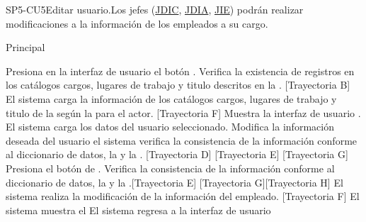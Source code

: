 \begin{UseCase}{SP5-CU5}{Editar usuario.}{Los jefes (\hyperlink{JDIC}{JDIC}, \hyperlink{JDIA}{JDIA}, \hyperlink{JIE}{JIE}) podrán realizar modificaciones a la información de los empleados a su cargo.}
{\begin{itemize}
		\end{itemize}
	}
	
\end{UseCase}

\begin{UCtrayectoria}{Principal}
	
	\UCpaso[\UCactor] Presiona en la interfaz de usuario  el botón \BtnLapiz .
	\UCpaso Verifica la existencia de registros en los catálogos cargos, lugares de trabajo y titulo descritos en la . [Trayectoria B]
	\UCpaso El sistema carga la información de los catálogos cargos, lugares de trabajo y titulo de la  según la  para el actor. [Trayectoria F]
	\UCpaso Muestra la interfaz de usuario  . 
	\UCpaso El sistema carga los datos del usuario seleccionado. 
	\UCpaso[\UCactor] Modifica la información deseada del usuario el sistema verifica la consistencia de la información conforme al diccionario de datos, la   y la .  [Trayectoria D] [Trayectoria E]  [Trayectoria G] 
	\UCpaso[\UCactor]  Presiona el botón de .
	\UCpaso Verifica la consistencia de la información conforme al diccionario de datos, la  y la .[Trayectoria E] [Trayectoria G][Trayectoria H]
	\UCpaso El sistema realiza la modificación de la información del empleado. [Trayectoria F] 
	\UCpaso  El sistema muestra el   
	\UCpaso El sistema regresa a la interfaz de usuario 
\end{UCtrayectoria}

